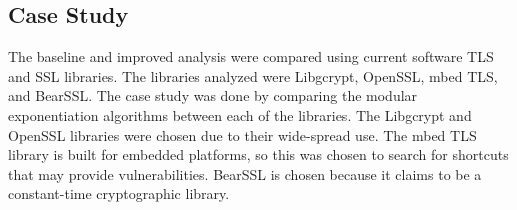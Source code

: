 \iffalse
\begin{table*}
	\centering
		\begin{tabular}{@{}lrrrrrrrrrrr@{}}
			
			
			
		\end{tabular}
		\caption{Number of Warnings based on Features (New-1)}
		\label{tbl:overall-feature-benchmark-new-1}
	\end{table*}
\fi

\iffalse
\begin{table*}
	\centering
		\begin{tabular}{@{}lrrrrrrrrrrr@{}}
			
			
			
		\end{tabular}
		\caption{Number of Warnings based on Features (New-2)}
		\label{tbl:overall-feature-benchmark-new-2}
	\end{table*}
\fi

\subsection{Case Study}

The baseline and improved analysis were compared using current software TLS and
SSL libraries. The libraries analyzed were Libgcrypt, OpenSSL, mbed TLS, and
BearSSL. The case study was done by comparing the modular exponentiation
algorithms between each of the libraries. The Libgcrypt and OpenSSL libraries
were chosen due to their wide-spread use. The mbed TLS library is built for
embedded platforms, so this was chosen to search for shortcuts that may provide
vulnerabilities. BearSSL is chosen because it claims to be a constant-time
cryptographic library.

